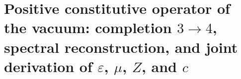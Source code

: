 \chapter{Positive constitutive operator of the vacuum: completion \(3\to4\), spectral reconstruction, and joint derivation of \(\varepsilon\), \(\mu\), \(Z\), and \(c\)}
\label{chap:p3-final:39:vacio_constitutivo}


